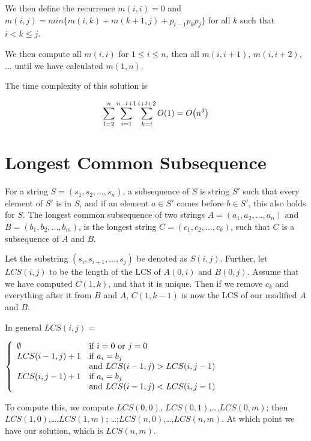We then define the recurrence $m(i,i) = 0$ and $m(i,j) = min \{ m(i,k) +
m(k+1,j) + p_{i-1}p_kp_j \}$ for all $k$ such that $i < k \leq j$.

We then compute all $m(i,i)$ for $1 \leq i \leq n$, then all
$m(i,i+1)$, $m(i,i+2)$, ... until we have calculated $m(1,n)$.

The time complexity of this solution is

\[
  \displaystyle\sum\limits_{l=2}^{n}\displaystyle\sum\limits_{i=1}^{n-l+1}\displaystyle\sum\limits_{k=i}^{i+l+2}O\!\left(1\right) = O\!\left(n^3\right)
\]

\section{Longest Common Subsequence}

For a string $S = (s_1,s_2,\dots,s_n)$, a subsequence of $S$ is string $S'$ such that every element of $S'$ is in $S$, and if an element $a \in S'$ comes before $b \in S'$, this also holds for $S$. The longest common subsequence of two strings $A=(a_1,a_2,\dots,a_n)$ and $B = (b_1,b_2,\dots,b_m)$, is the longest string $C = (c_1,c_2,\dots,c_k)$, such that $C$ is a subsequence of $A$ and $B$.

Let the substring $(s_i,s_{i+1},\dots,s_j)$ be denoted as $S(i,j)$. Further, let $LCS(i,j)$ to be the length of the LCS of $A(0,i)$ and $B(0,j)$. Assume that we have computed $C(1,k)$, and that it is unique. Then if we remove $c_k$ and everything after it from $B$ and $A$, $C(1,k-1)$ is now the LCS of our modified $A$ and $B$. 

In general 
$LCS(i,j) =$

\begin{math}
   \left\{
    \begin{array}{l l}
      \emptyset 		& \text{if $i=0$ or $j=0$}\\
      LCS(i-1,j)+1 	& \text{if $a_i=b_j$}\\
      					& \text{and $LCS(i-1,j)>LCS(i,j-1)$}\\
      LCS(i,j-1)+1 	& \text{if $a_i=b_j$}\\
      					& \text{and $LCS(i-1,j)<LCS(i,j-1)$}\\
      
    \end{array} \right.
\end{math}

To compute this, we compute $LCS(0,0)$, $LCS(0,1)$,\dots,$LCS(0,m)$; then $LCS(1,0)$,\dots,$LCS(1,m)$; \dots;$LCS(n,0)$,\dots,$LCS(n,m)$. At which point we have our solution, which is $LCS(n,m)$.

